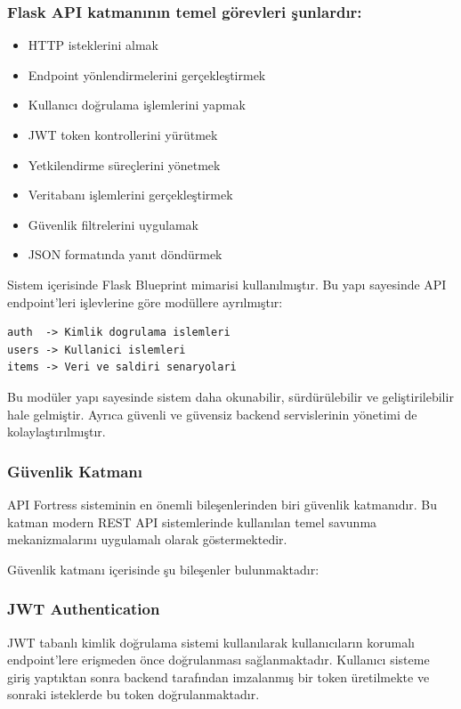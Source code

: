 \subsubsection{Flask API katmanının temel görevleri şunlardır:}

\begin{itemize}[leftmargin=*]
    \item HTTP isteklerini almak
    \item Endpoint yönlendirmelerini gerçekleştirmek
    \item Kullanıcı doğrulama işlemlerini yapmak
    \item JWT token kontrollerini yürütmek
    \item Yetkilendirme süreçlerini yönetmek
    \item Veritabanı işlemlerini gerçekleştirmek
    \item Güvenlik filtrelerini uygulamak
    \item JSON formatında yanıt döndürmek
\end{itemize}

Sistem içerisinde Flask Blueprint mimarisi kullanılmıştır. Bu yapı sayesinde API endpoint’leri işlevlerine göre modüllere ayrılmıştır:

\begin{verbatim}
auth  -> Kimlik dogrulama islemleri
users -> Kullanici islemleri
items -> Veri ve saldiri senaryolari
\end{verbatim}

Bu modüler yapı sayesinde sistem daha okunabilir, sürdürülebilir ve geliştirilebilir hale gelmiştir. Ayrıca güvenli ve güvensiz backend servislerinin yönetimi de kolaylaştırılmıştır.

\subsubsection{Güvenlik Katmanı}

API Fortress sisteminin en önemli bileşenlerinden biri güvenlik katmanıdır. Bu katman modern REST API sistemlerinde kullanılan temel savunma mekanizmalarını uygulamalı olarak göstermektedir.

Güvenlik katmanı içerisinde şu bileşenler bulunmaktadır:

\subsubsection{JWT Authentication}

JWT tabanlı kimlik doğrulama sistemi kullanılarak kullanıcıların korumalı endpoint’lere erişmeden önce doğrulanması sağlanmaktadır. Kullanıcı sisteme giriş yaptıktan sonra backend tarafından imzalanmış bir token üretilmekte ve sonraki isteklerde bu token doğrulanmaktadır.

